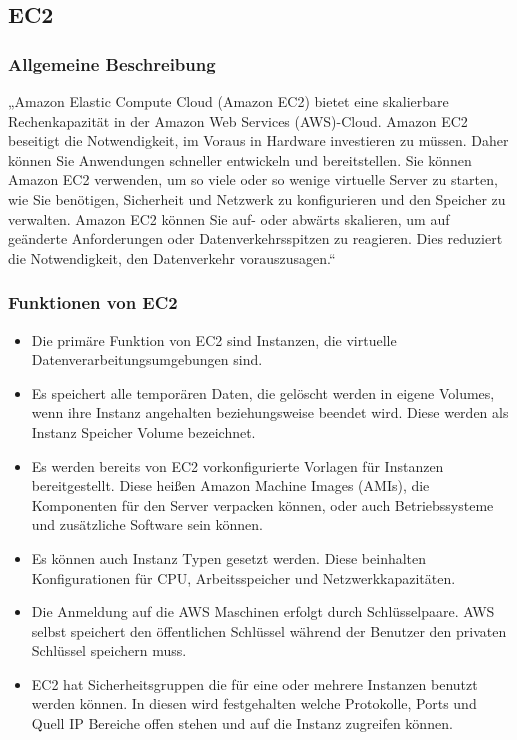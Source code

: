 \subsection{EC2}\label{ssec:ec2}
\subsubsection{Allgemeine Beschreibung}
„Amazon Elastic Compute Cloud (Amazon EC2) bietet eine skalierbare Rechenkapazität in der Amazon Web Services (AWS)-Cloud. Amazon EC2 beseitigt die Notwendigkeit, im Voraus in Hardware investieren zu müssen. Daher können Sie Anwendungen schneller entwickeln und bereitstellen. Sie können Amazon EC2 verwenden, um so viele oder so wenige virtuelle Server zu starten, wie Sie benötigen, Sicherheit und Netzwerk zu konfigurieren und den Speicher zu verwalten. Amazon EC2 können Sie auf- oder abwärts skalieren, um auf geänderte Anforderungen oder Datenverkehrsspitzen zu reagieren. Dies reduziert die Notwendigkeit, den Datenverkehr vorauszusagen.“ ~\cite{amazon_ec2_2020}
\newpage
\subsubsection{Funktionen von EC2}
\begin{itemize}
    \item Die primäre Funktion von EC2 sind Instanzen, die virtuelle Datenverarbeitungsumgebungen sind.
    \item Es speichert alle temporären Daten, die gelöscht werden in eigene Volumes, wenn ihre Instanz angehalten beziehungsweise beendet wird. Diese werden als Instanz Speicher Volume bezeichnet.
    \item Es werden bereits von EC2 vorkonfigurierte Vorlagen für Instanzen bereitgestellt. Diese heißen Amazon Machine Images (AMIs), die Komponenten für den Server verpacken können, oder auch Betriebssysteme und zusätzliche Software sein können.
    \item Es können auch Instanz Typen gesetzt werden. Diese beinhalten Konfigurationen für CPU, Arbeitsspeicher und Netzwerkkapazitäten.
    \item Die Anmeldung auf die AWS Maschinen erfolgt durch Schlüsselpaare. AWS selbst speichert den öffentlichen Schlüssel während der Benutzer den privaten Schlüssel speichern muss.
    \item EC2 hat Sicherheitsgruppen die für eine oder mehrere Instanzen benutzt werden können. In diesen wird festgehalten welche Protokolle, Ports und Quell IP Bereiche offen stehen und auf die Instanz zugreifen können.
\end{itemize}

